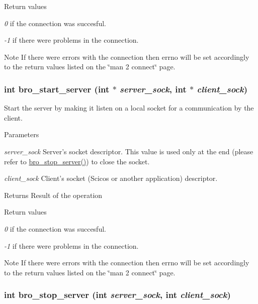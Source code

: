 \begin{DoxyRetVals}{Return values}
\item[{\em 0}]if the connection was succesful. \item[{\em -\/1}]if there were problems in the connection. \end{DoxyRetVals}
\begin{DoxyNote}{Note}
If there were errors with the connection then {\ttfamily errno} will be set accordingly to the return values listed on the {\ttfamily \char`\"{}man 2
        connect\char`\"{}} page. 
\end{DoxyNote}
\hypertarget{group___bro_comm_ga7fa314c91710130869c2d4ba31f4ac77}{
\subsubsection[{bro\_\-start\_\-server}]{\setlength{\rightskip}{0pt plus 5cm}int bro\_\-start\_\-server (int $\ast$ {\em server\_\-sock}, \/  int $\ast$ {\em client\_\-sock})}}
\label{group___bro_comm_ga7fa314c91710130869c2d4ba31f4ac77}


Start the server by making it listen on a local socket for a communication by the client. 


\begin{DoxyParams}{Parameters}
\item[{\em server\_\-sock}]Server's socket descriptor. This value is used only at the end (please refer to \hyperlink{group___bro_comm_ga1686032e099ddba351e93ec6ec6f6b4f}{bro\_\-stop\_\-server()}) to close the socket. \item[{\em client\_\-sock}]Client's socket (Scicos or another application) descriptor. \end{DoxyParams}
\begin{DoxyReturn}{Returns}
Result of the operation 
\end{DoxyReturn}

\begin{DoxyRetVals}{Return values}
\item[{\em 0}]if the connection was succesful. \item[{\em -\/1}]if there were problems in the connection. \end{DoxyRetVals}
\begin{DoxyNote}{Note}
If there were errors with the connection then {\ttfamily errno} will be set accordingly to the return values listed on the {\ttfamily \char`\"{}man 2
        connect\char`\"{}} page. 
\end{DoxyNote}
\hypertarget{group___bro_comm_ga1686032e099ddba351e93ec6ec6f6b4f}{
\subsubsection[{bro\_\-stop\_\-server}]{\setlength{\rightskip}{0pt plus 5cm}int bro\_\-stop\_\-server (int {\em server\_\-sock}, \/  int {\em client\_\-sock})}}
\label{group___bro_comm_ga1686032e099ddba351e93ec6ec6f6b4f}


